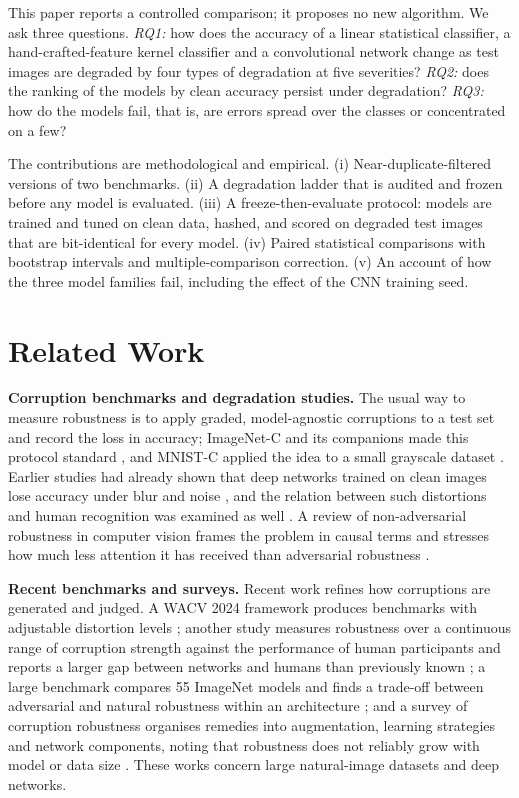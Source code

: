 \documentclass[conference]{IEEEtran}
\begin{document}
This paper reports a controlled comparison; it proposes no new algorithm. We ask three questions. \emph{RQ1:} how does the accuracy of a linear statistical
classifier, a hand-crafted-feature kernel classifier and a convolutional network change as test images are degraded by four types of degradation at five
severities? \emph{RQ2:} does the ranking of the models by clean accuracy persist under degradation? \emph{RQ3:} how do the models fail, that is, are errors spread over
the classes or concentrated on a few?

The contributions are methodological and empirical. (i) Near-duplicate-filtered versions of two benchmarks. (ii) A degradation ladder that is audited and frozen before
any model is evaluated. (iii) A freeze-then-evaluate protocol: models are trained and tuned on clean data, hashed, and scored on degraded test images that are
bit-identical for every model. (iv) Paired statistical comparisons with bootstrap intervals and multiple-comparison correction. (v) An account of how the three
model families fail, including the effect of the CNN training seed.

\section{Related Work}
\textbf{Corruption benchmarks and degradation studies.} The usual way to measure robustness is to apply graded, model-agnostic corruptions to a test set and record the
loss in accuracy; ImageNet-C and its companions made this protocol standard \cite{hendrycks2019}, and MNIST-C applied the idea to a small grayscale dataset \cite{mu2019}.
Earlier studies had already shown that deep networks trained on clean images lose accuracy under blur and noise \cite{dodge2016,vasiljevic2016}, and the
relation between such distortions and human recognition was examined as well \cite{dodge2017}. A review of non-adversarial robustness in computer vision
frames the problem in causal terms and stresses how much less attention it has received than adversarial robustness \cite{drenkow2022}.

\textbf{Recent benchmarks and surveys.} Recent work refines how corruptions are generated and judged. A WACV 2024 framework produces benchmarks with adjustable distortion
levels \cite{sarkar2024}; another study measures robustness over a continuous range of corruption strength against the performance of human participants and reports a larger gap
between networks and humans than previously known \cite{shen2024}; a large benchmark compares 55 ImageNet models and finds a trade-off between adversarial and natural
robustness within an architecture \cite{liu2023}; and a survey of corruption robustness organises remedies into augmentation, learning strategies and network components, noting that
robustness does not reliably grow with model or data size \cite{wang2024}. These works concern large natural-image datasets and deep networks.
\end{document}
